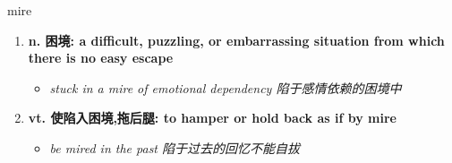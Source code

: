 
\begin{frame}
{\huge mire}
\begin{center}
\begin{enumerate}\Large
  \item \textbf{n. 困境: a difficult, puzzling, or embarrassing situation from which there is no easy escape}
  \begin{itemize}
    \item \em{\Large{stuck in a mire of emotional dependency 陷于感情依赖的困境中}}
  \end{itemize}
  \item \textbf{vt. 使陷入困境,拖后腿: to hamper or hold back as if by mire}
  \begin{itemize}
    \item \em{\Large{be mired in the past 陷于过去的回忆不能自拔}}
  \end{itemize}
\end{enumerate}
\end{center}
\end{frame}
